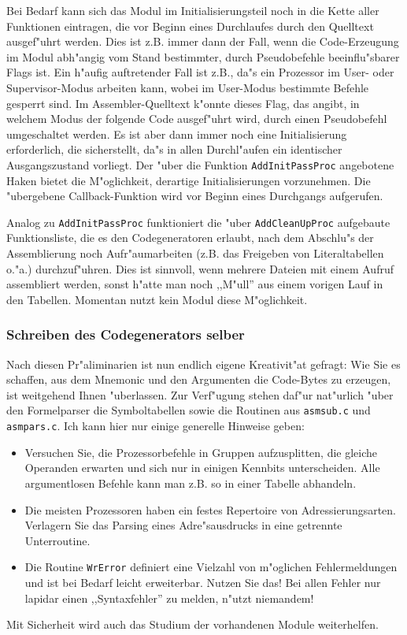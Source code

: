 \documentclass[12pt,a4paper,twoside]{report}
\newcommand{\tty}[1]{{\tt #1}}
\begin{document}
{Bei Bedarf kann sich das Modul im Initialisierungsteil noch in die
Kette aller Funktionen eintragen, die vor Beginn eines Durchlaufes
durch den Quelltext ausgef"uhrt werden.  Dies ist z.B. immer dann der
Fall, wenn die Code-Erzeugung im Modul abh"angig vom Stand bestimmter,
durch Pseudobefehle beeinflu"sbarer Flags ist.  Ein h"aufig auftretender
Fall ist z.B., da"s ein Prozessor im User- oder Supervisor-Modus
arbeiten kann, wobei im User-Modus bestimmte Befehle gesperrt
sind.  Im Assembler-Quelltext k"onnte dieses Flag, das angibt, in welchem
Modus der folgende Code ausgef"uhrt wird, durch einen Pseudobefehl
umgeschaltet werden.  Es ist aber dann immer noch eine Initialisierung
erforderlich, die sicherstellt, da"s in allen Durchl"aufen ein identischer
Ausgangszustand vorliegt.  Der "uber die Funktion \tty{AddInitPassProc}
angebotene Haken bietet die M"oglichkeit, derartige Initialisierungen
vorzunehmen.  Die "ubergebene Callback-Funktion wird vor Beginn
eines Durchgangs aufgerufen.

Analog zu \tty{AddInitPassProc} funktioniert die "uber \tty{AddCleanUpProc}
aufgebaute Funktionsliste, die es den Codegeneratoren erlaubt, nach dem
Abschlu"s der Assemblierung noch Aufr"aumarbeiten (z.B. das Freigeben von
Literaltabellen o."a.) durchzuf"uhren.  Dies ist sinnvoll, wenn mehrere
Dateien mit einem Aufruf assembliert werden, sonst h"atte man noch
,,M"ull'' aus einem vorigen Lauf in den Tabellen.  Momentan nutzt kein
Modul diese M"oglichkeit.

\subsubsection{Schreiben des Codegenerators selber}

Nach diesen Pr"aliminarien ist nun endlich eigene Kreativit"at gefragt:
Wie Sie es schaffen, aus dem Mnemonic und den Argumenten die Code-Bytes zu
erzeugen, ist weitgehend Ihnen "uberlassen.  Zur Verf"ugung stehen daf"ur
nat"urlich "uber den Formelparser die Symboltabellen sowie die Routinen
aus
\tty{asmsub.c} und \tty{asmpars.c}.  Ich kann hier nur einige generelle 
Hinweise geben:
\begin{itemize}
\item{Versuchen Sie, die Prozessorbefehle in Gruppen aufzusplitten, die
      gleiche Operanden erwarten und sich nur in einigen Kennbits
      unterscheiden.  Alle argumentlosen Befehle kann man z.B. so in einer
      Tabelle abhandeln.}
\item{Die meisten Prozessoren haben ein festes Repertoire von
      Adressierungsarten.  Verlagern Sie das Parsing eines Adre"sausdrucks
      in eine getrennte Unterroutine.}
\item{Die Routine \tty{WrError} definiert eine Vielzahl von m"oglichen
      Fehlermeldungen und ist bei Bedarf leicht erweiterbar.  Nutzen Sie
      das!  Bei allen Fehler nur lapidar einen ,,Syntaxfehler'' zu melden,
      n"utzt niemandem!}
\end{itemize}
Mit Sicherheit wird auch das Studium der vorhandenen Module weiterhelfen.

}
\end{document}
